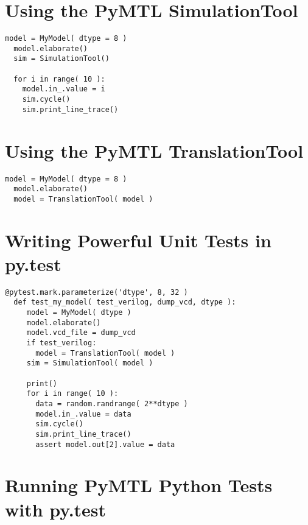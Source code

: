 \documentclass{cbxdoc}
\begin{document}
\section{Using the PyMTL SimulationTool}
\begin{lstlisting}[style=simple]
  model = MyModel( dtype = 8 )
  model.elaborate()
  sim = SimulationTool()

  for i in range( 10 ):
    model.in_.value = i
    sim.cycle()
    sim.print_line_trace()
\end{lstlisting}

\section{Using the PyMTL TranslationTool}
\begin{lstlisting}[style=simple]
  model = MyModel( dtype = 8 )
  model.elaborate()
  model = TranslationTool( model )
\end{lstlisting}

\section{Writing Powerful Unit Tests in py.test}
\begin{lstlisting}[style=simple]
  @pytest.mark.parameterize('dtype', 8, 32 )
  def test_my_model( test_verilog, dump_vcd, dtype ):
     model = MyModel( dtype )
     model.elaborate()
     model.vcd_file = dump_vcd
     if test_verilog:
       model = TranslationTool( model )
     sim = SimulationTool( model )

     print()
     for i in range( 10 ):
       data = random.randrange( 2**dtype )
       model.in_.value = data
       sim.cycle()
       sim.print_line_trace()
       assert model.out[2].value = data
\end{lstlisting}


\section{Running PyMTL Python Tests with py.test}
\end{document}
